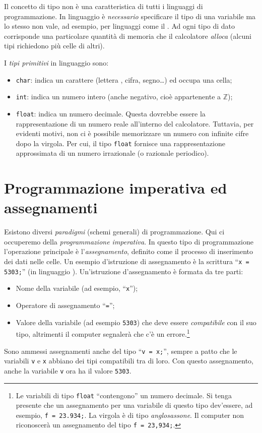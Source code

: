 Il concetto di tipo non è una caratteristica di tutti i linguaggi di programmazione.
In linguaggio  è \emph{necessario} specificare il tipo di una variabile ma lo stesso non vale, ad esempio, per linguaggi come il .
Ad ogni tipo di dato corrisponde una particolare quantità di memoria che il calcolatore \emph{alloca} (alcuni tipi richiedono più celle di altri).

I  \emph{tipi primitivi} in linguaggio  sono:
\begin{itemize}
	\item
\lstinline!char!: indica un carattere (lettera , cifra, segno…) ed occupa una cella;
	\item
\lstinline!int!: indica un numero intero (anche negativo, cioè appartenente a $\mathbb{Z}$);
	\item

\lstinline!float!: indica un numero decimale. Questa dovrebbe essere la rappresentazione di un numero reale all'interno del calcolatore. Tuttavia, per evidenti motivi, non ci è possibile memorizzare un numero con infinite cifre dopo la virgola. Per cui, il tipo \lstinline!float! fornisce una rappresentazione approssimata di un numero irrazionale (o razionale periodico).
\end{itemize}

	\section{Programmazione imperativa ed assegnamenti}
Esistono diversi \emph{paradigmi} (schemi generali) di programmazione.
Qui ci occuperemo della \emph{programmazione imperativa}.
In  questo tipo di programmazione l'operazione principale è l'\emph{assegnamento}, definito come il processo di inserimento dei dati nelle celle.
Un esempio d'istruzione di assegnamento è la scrittura ``\lstinline!x = 5303;!'' (in linguaggio ).
Un'istruzione d'assegnamento è formata da tre parti:
\begin{itemize}
	\item
Nome della variabile (ad esempio, ``\lstinline!x!'');
	\item
Operatore di assegnamento ``\lstinline!=!'';
	\item
Valore della variabile (ad esempio \lstinline!5303!) che deve essere \emph{compatibile} con il suo tipo, altrimenti il computer segnalerà che c'è un errore.\footnote{Le variabili di tipo \lstinline!float! ``contengono'' un numero decimale.
Si tenga presente che un assegnamento per una variabile di questo tipo dev'essere, ad esempio, \lstinline!f = 23.934;!.
La virgola è di tipo \emph{anglosassone}.
Il computer non riconoscerà un assegnamento del tipo \lstinline!f = 23,934;!.
}
\end{itemize}
Sono ammessi assegnamenti anche del tipo ``\lstinline!v = x;!'', sempre a patto che le variabili \lstinline!v! e \lstinline!x! abbiano dei tipi compatibili tra di loro.
Con questo assegnamento, anche la variabile \lstinline!v! ora ha il valore \lstinline!5303!.

